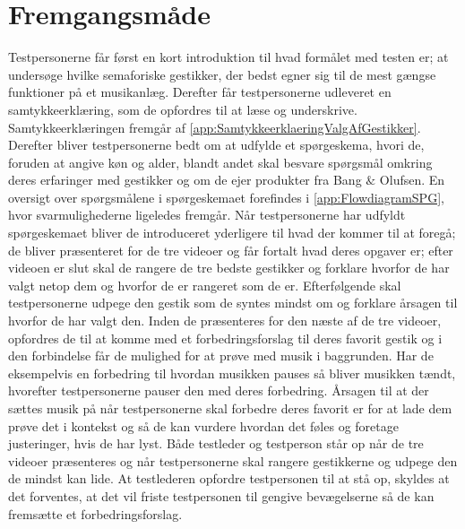 \section{Fremgangsmåde}
\label{FremgangsmaadeValgAfGestikker}
%
Testpersonerne får først en kort introduktion til hvad formålet med testen er; at undersøge hvilke semaforiske gestikker, der bedst egner sig til de mest gængse funktioner på et musikanlæg. Derefter får testpersonerne udleveret en samtykkeerklæring, som de opfordres til at læse og underskrive. Samtykkeerklæringen fremgår af \autoref{app:SamtykkeerklaeringValgAfGestikker}. Derefter bliver testpersonerne bedt om at udfylde et spørgeskema, hvori de, foruden at angive køn og alder, blandt andet skal besvare spørgsmål omkring deres erfaringer med gestikker og om de ejer produkter fra Bang $\&$ Olufsen. En oversigt over spørgsmålene i spørgeskemaet forefindes i \autoref{app:FlowdiagramSPG}, hvor svarmulighederne ligeledes fremgår. Når testpersonerne har udfyldt spørgeskemaet bliver de introduceret yderligere til hvad der kommer til at foregå; de bliver præsenteret for de tre videoer og får fortalt hvad deres opgaver er; efter videoen er slut skal de rangere de tre bedste gestikker og forklare hvorfor de har valgt netop dem og hvorfor de er rangeret som de er. Efterfølgende skal testpersonerne udpege den gestik som de syntes mindst om og forklare årsagen til hvorfor de har valgt den. Inden de præsenteres for den næste af de tre videoer, opfordres de til at komme med et forbedringsforslag til deres favorit gestik og i den forbindelse får de mulighed for at prøve med musik i baggrunden. Har de eksempelvis en forbedring til hvordan musikken pauses så bliver musikken tændt, hvorefter testpersonerne pauser den med deres forbedring. Årsagen til at der sættes musik på når testpersonerne skal forbedre deres favorit er for at lade dem prøve det i kontekst og så de kan vurdere hvordan det føles og foretage justeringer, hvis de har lyst. Både testleder og testperson står op når de tre videoer præsenteres og når testpersonerne skal rangere gestikkerne og udpege den de mindst kan lide. At testlederen opfordre testpersonen til at stå op, skyldes at det forventes, at det vil friste testpersonen til gengive bevægelserne så de kan fremsætte et forbedringsforslag. 

